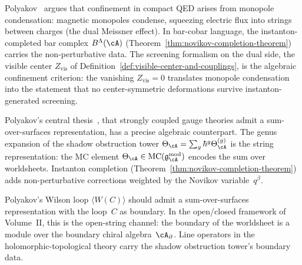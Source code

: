 \begin{remark}
\label{rem:polyakov-confinement-algebraized}
Polyakov~\cite{Pol87} argues that confinement in compact QED arises from monopole condensation: magnetic monopoles condense, squeezing electric flux into strings between charges (the dual Meissner effect). In bar-cobar language, the instanton-completed bar complex $B^\Lambda(\cA)$ (Theorem~\ref{thm:novikov-completion-theorem}) carries the non-perturbative data. The screening formalism on the dual side, the visible center $Z_{\mathrm{vis}}$ of Definition~\ref{def:visible-center-and-couplings}, is the algebraic confinement criterion: the vanishing $Z_{\mathrm{vis}} = 0$ translates monopole condensation into the statement that no center-symmetric deformations survive instanton-generated screening.
\end{remark}

\begin{remark}
\label{rem:gauge-string-shadow-tower}
Polyakov's central thesis~\cite{Pol87}, that strongly coupled gauge theories admit a sum-over-surfaces representation, has a precise algebraic counterpart. The genus expansion of the shadow obstruction tower $\Theta_\cA = \sum_g \hbar^g \Theta_\cA^{(g)}$ is the string representation: the MC element $\Theta_\cA \in \mathrm{MC}(\mathfrak{g}^{\mathrm{mod}}_\cA)$ encodes the sum over worldsheets. Instanton completion (Theorem~\ref{thm:novikov-completion-theorem}) adds non-perturbative corrections weighted by the Novikov variable~$q^\beta$.
\end{remark}

\begin{remark}
\label{rem:wilson-loop-boundary}
Polyakov's Wilson loop $\langle W(C) \rangle$ should admit a sum-over-surfaces representation with the loop~$C$ as boundary. In the open/closed framework of Volume~II, this is the open-string channel: the boundary of the worldsheet is a module over the boundary chiral algebra~$\cA_{\partial}$. Line operators in the holomorphic-topological theory carry the shadow obstruction tower's boundary data.
\end{remark}
